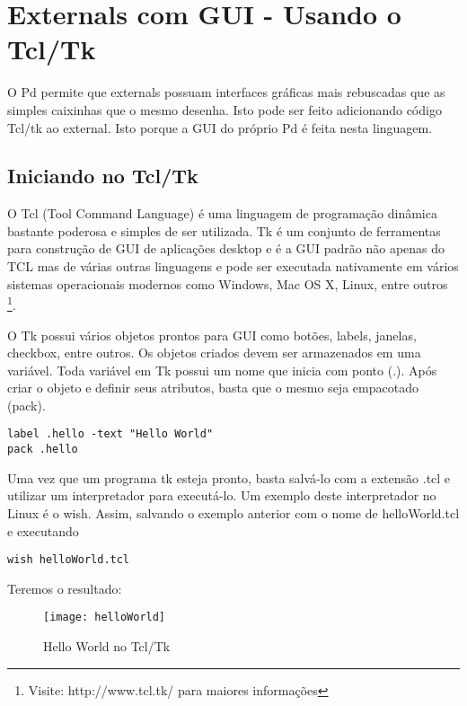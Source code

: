 
\chapter{Externals com GUI - Usando o Tcl/Tk}

O Pd permite que externals possuam interfaces gráficas mais rebuscadas que as simples
caixinhas que o mesmo desenha. Isto pode ser feito adicionando código Tcl/tk ao external.
Isto porque a GUI do próprio Pd é feita nesta linguagem.

\section{Iniciando no Tcl/Tk}

O Tcl (Tool Command Language) é uma linguagem de programação dinâmica bastante poderosa e simples de ser utilizada. 
Tk é um conjunto de ferramentas para construção de GUI de aplicações desktop e é a GUI padrão não apenas do TCL mas 
de várias outras linguagens e pode ser executada nativamente em vários sistemas operacionais modernos como Windows,
 Mac OS X, Linux, entre outros \footnote{Visite: http://www.tcl.tk/ para maiores informações}.

O Tk possui vários objetos prontos para GUI como botões, labels, janelas, checkbox, entre outros. Os objetos criados
devem ser armazenados em uma variável. Toda variável em Tk possui um nome que inicia com ponto (.). Após criar o objeto
e definir seus atributos, basta que o mesmo seja empacotado (pack).

\begin{lstlisting}
label .hello -text "Hello World"
pack .hello
\end{lstlisting}

Uma vez que um programa tk esteja pronto, basta salvá-lo com a extensão .tcl e utilizar um interpretador para executá-lo.
Um exemplo deste interpretador no Linux é o wish. Assim, salvando o exemplo anterior com o nome de helloWorld.tcl e executando

\begin{lstlisting}
wish helloWorld.tcl
\end{lstlisting}

Teremos o resultado:
\begin{figure}[ht!]
	\centering
	\texttt{[image: helloWorld]}
	\caption{Hello World no Tcl/Tk}
\end{figure}

